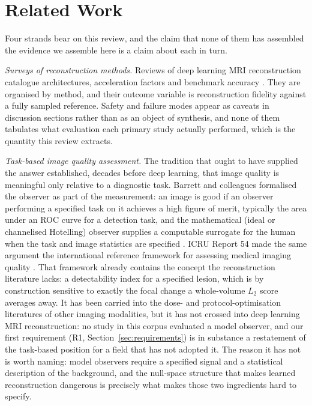 \documentclass[review,authoryear]{elsarticle}
\begin{document}
\section{Related Work}
\label{sec:related}

Four strands bear on this review, and the claim that none of them has assembled the
evidence we assemble here is a claim about each in turn.

\emph{Surveys of reconstruction methods.} Reviews of deep learning MRI reconstruction
catalogue architectures, acceleration factors and benchmark accuracy
\citep{liang2020deep,montalt2021machine,knollsurvey2020,kazerouni2023diffusion}. They
are organised by method, and their outcome variable is reconstruction fidelity against
a fully sampled reference. Safety and failure modes appear as caveats in discussion
sections rather than as an object of synthesis, and none of them tabulates what
evaluation each primary study actually performed, which is the quantity this review
extracts.

\emph{Task-based image quality assessment.} The tradition that ought to have supplied
the answer established, decades before deep learning, that image quality is meaningful
only relative to a diagnostic task. Barrett and colleagues formalised the observer as
part of the measurement: an image is good if an observer performing a specified task on
it achieves a high figure of merit, typically the area under an ROC curve for a
detection task, and the mathematical (ideal or channelised Hotelling) observer supplies
a computable surrogate for the human when the task and image statistics are specified
\citep{barrett1993model,barrett2004foundations}. ICRU Report 54 made the same argument
the international reference framework for assessing medical imaging quality \citep{icru54}. That
framework already contains the concept the reconstruction literature lacks: a
detectability index for a specified lesion, which is by construction sensitive to
exactly the focal change a whole-volume $L_2$ score averages away. It has been carried
into the dose- and protocol-optimisation literatures of other imaging modalities, but it
has not crossed into deep learning MRI reconstruction: no study in this corpus evaluated
a model observer, and our first requirement (R1, Section~\ref{sec:requirements}) is in
substance a restatement of the task-based position for a field that has not adopted it.
The reason it has not is worth naming: model observers require a specified signal and a
statistical description of the background, and the null-space structure that makes
learned reconstruction dangerous is precisely what makes those two ingredients hard to
specify.
\end{document}

